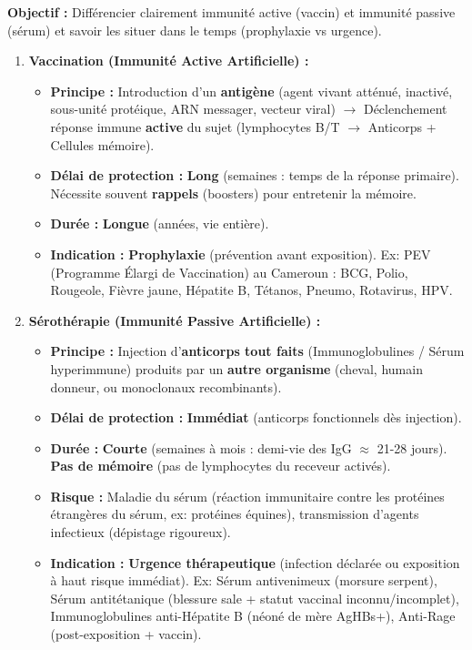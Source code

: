 \documentclass[11pt]{article}
\begin{document}
\begin{methode}
\textbf{Objectif :} Différencier clairement immunité active (vaccin) et immunité passive (sérum) et savoir les situer dans le temps (prophylaxie vs urgence).
\begin{enumerate}
 \item \textbf{Vaccination (Immunité Active Artificielle) :}
 \begin{itemize}
 \item \textbf{Principe :} Introduction d'un \textbf{antigène} (agent vivant atténué, inactivé, sous-unité protéique, ARN messager, vecteur viral) $\rightarrow$ Déclenchement réponse immune \textbf{active} du sujet (lymphocytes B/T $\rightarrow$ Anticorps + Cellules mémoire).
 \item \textbf{Délai de protection :} \textbf{Long} (semaines : temps de la réponse primaire). Nécessite souvent \textbf{rappels} (boosters) pour entretenir la mémoire.
 \item \textbf{Durée :} \textbf{Longue} (années, vie entière).
 \item \textbf{Indication :} \textbf{Prophylaxie} (prévention avant exposition). Ex: PEV (Programme Élargi de Vaccination) au Cameroun : BCG, Polio, Rougeole, Fièvre jaune, Hépatite B, Tétanos, Pneumo, Rotavirus, HPV.
 \end{itemize}
 \item \textbf{Sérothérapie (Immunité Passive Artificielle) :}
 \begin{itemize}
 \item \textbf{Principe :} Injection d'\textbf{anticorps tout faits} (Immunoglobulines / Sérum hyperimmune) produits par un \textbf{autre organisme} (cheval, humain donneur, ou monoclonaux recombinants).
 \item \textbf{Délai de protection :} \textbf{Immédiat} (anticorps fonctionnels dès injection).
 \item \textbf{Durée :} \textbf{Courte} (semaines à mois : demi-vie des IgG $\approx$ 21-28 jours). \textbf{Pas de mémoire} (pas de lymphocytes du receveur activés).
 \item \textbf{Risque :} Maladie du sérum (réaction immunitaire contre les protéines étrangères du sérum, ex: protéines équines), transmission d'agents infectieux (dépistage rigoureux).
 \item \textbf{Indication :} \textbf{Urgence thérapeutique} (infection déclarée ou exposition à haut risque immédiat). Ex: Sérum antivenimeux (morsure serpent), Sérum antitétanique (blessure sale + statut vaccinal inconnu/incomplet), Immunoglobulines anti-Hépatite B (néoné de mère AgHBs+), Anti-Rage (post-exposition + vaccin).

\end{itemize}
\end{enumerate}
\end{methode}
\end{document}

